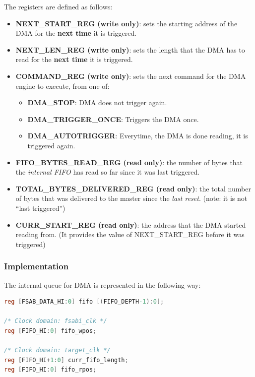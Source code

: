 \documentclass[10pt]{article}
\begin{document}
The registers are defined as follows:

\begin{itemize}
\item{\textbf{NEXT\_START\_REG (write only)}: sets the starting address of
the DMA for the \textbf{next time} it is triggered.}

\item{\textbf{NEXT\_LEN\_REG (write only)}: sets the length that the DMA has
to read for the \textbf{next time} it is triggered.}

\item{\textbf{COMMAND\_REG (write only)}: sets the next command for the DMA
engine to execute, from one of:}
\begin{itemize}
\item{\textbf{DMA\_STOP}: DMA does not trigger again.}
\item{\textbf{DMA\_TRIGGER\_ONCE}: Triggers the DMA once.}
\item{\textbf{DMA\_AUTOTRIGGER}: Everytime, the DMA is done reading, it is
triggered again.}
\end{itemize}

\item{\textbf{FIFO\_BYTES\_READ\_REG (read only)}: the number of bytes that
the \textit{internal FIFO} has read so far since it was last triggered.}

\item{\textbf{TOTAL\_BYTES\_DELIVERED\_REG (read only)}: the total number of
bytes that was delivered to the master since the \textit{last reset}. (note:
it is not ``last triggered'')}

\item{\textbf{CURR\_START\_REG (read only)}: the address that the DMA
started reading from. (It provides the value of NEXT\_START\_REG before it was
triggered)}

\end{itemize}

\subsubsection{Implementation}

The internal queue for DMA is represented in the following way:

\begin{lstlisting}[basicstyle=\footnotesize,language=Verilog]
reg [FSAB_DATA_HI:0] fifo [(FIFO_DEPTH-1):0];
 
/* Clock domain: fsabi_clk */
reg [FIFO_HI:0] fifo_wpos;
 
/* Clock domain: target_clk */
reg [FIFO_HI+1:0] curr_fifo_length;
reg [FIFO_HI:0] fifo_rpos;
\end{lstlisting}
\end{document}
